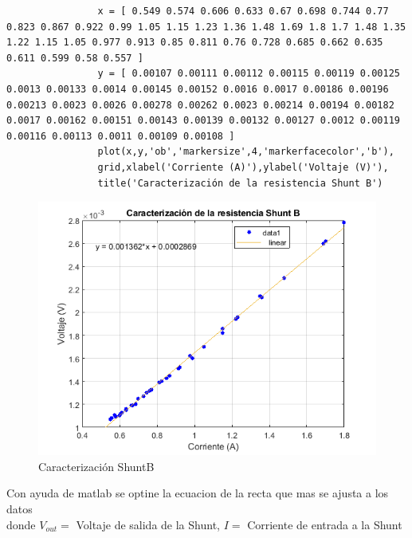             \begin{lstlisting}
                x = [ 0.549 0.574 0.606 0.633 0.67 0.698 0.744 0.77 0.823 0.867 0.922 0.99 1.05 1.15 1.23 1.36 1.48 1.69 1.8 1.7 1.48 1.35 1.22 1.15 1.05 0.977 0.913 0.85 0.811 0.76 0.728 0.685 0.662 0.635 0.611 0.599 0.58 0.557 ]
                y = [ 0.00107 0.00111 0.00112 0.00115 0.00119 0.00125 0.0013 0.00133 0.0014 0.00145 0.00152 0.0016 0.0017 0.00186 0.00196 0.00213 0.0023 0.0026 0.00278 0.00262 0.0023 0.00214 0.00194 0.00182 0.0017 0.00162 0.00151 0.00143 0.00139 0.00132 0.00127 0.0012 0.00119 0.00116 0.00113 0.0011 0.00109 0.00108 ]
                plot(x,y,'ob','markersize',4,'markerfacecolor','b'),
                grid,xlabel('Corriente (A)'),ylabel('Voltaje (V)'),
                title('Caracterización de la resistencia Shunt B')
            \end{lstlisting}

            \begin{figure}[H]
                \begin{center}
                    \includegraphics[width = 15cm]{3Proyecto/CorrienteVoltaje2.png}
                    \caption{ Caracterización ShuntB} 
                    \label{fig:Muestras shuntB}
                \end{center}
            \end{figure}

            Con ayuda de matlab se optine la ecuacion de la recta que mas se ajusta a los datos\\
            donde $V_{out}=$ Voltaje de salida de la Shunt, $I=$ Corriente de entrada a la Shunt 

